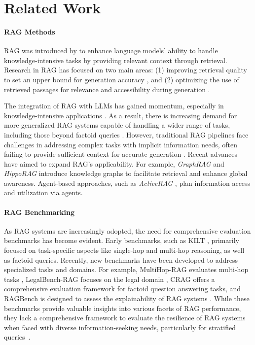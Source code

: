 \section{Related Work}
\paragraph{RAG Methods}  
RAG was introduced by \citet{lewis2020retrieval} to enhance language models' ability to handle knowledge-intensive tasks by providing relevant context through retrieval. Research in RAG has focused on two main areas: (1) improving retrieval quality to set an upper bound for generation accuracy \cite{qian2024grounding, gao2024retrievalaugmented}, and (2) optimizing the use of retrieved passages for relevance and accessibility during generation \cite{jiang2023active, longrag}.  

The integration of RAG with LLMs has gained momentum, especially in knowledge-intensive applications \cite{raghallucination}. As a result, there is increasing demand for more generalized RAG systems capable of handling a wider range of tasks, including those beyond factoid queries \cite{zhao2024retrievalaugmentedgenerationrag}. However, traditional RAG pipelines face challenges in addressing complex tasks with implicit information needs, often failing to provide sufficient context for accurate generation \cite{gao2024retrievalaugmented, zhao2024retrievalaugmentedgenerationrag}.  
Recent advances have aimed to expand RAG’s applicability. For example, \textit{GraphRAG} \cite{edge2024localglobalgraphrag} and \textit{HippoRAG} \cite{gutiérrez2024hipporagneurobiologicallyinspiredlongterm} introduce knowledge graphs to facilitate retrieval and enhance global awareness. Agent-based approaches, such as \textit{ActiveRAG} \cite{activerag, yoon2024compactcompressingretrieveddocuments}, plan information access and utilization via agents. 


\paragraph{RAG Benchmarking}  
As RAG systems are increasingly adopted, the need for comprehensive evaluation benchmarks has become evident. Early benchmarks, such as KILT \cite{kilt}, primarily focused on task-specific aspects like single-hop and multi-hop reasoning, as well as factoid queries. Recently, new benchmarks have been developed to address specialized tasks and domains. For example, MultiHop-RAG evaluates multi-hop tasks \cite{multihopbench}, LegalBench-RAG focuses on the legal domain \cite{LegalBench}, CRAG offers a comprehensive evaluation framework for factoid question answering tasks, and RAGBench is designed to assess the explainability of RAG systems \cite{RAGBench}. While these benchmarks provide valuable insights into various facets of RAG performance, they lack a comprehensive framework to evaluate the resilience of RAG systems when faced with diverse information-seeking needs, particularly for stratified queries~\cite{zhao2024retrievalaugmentedgenerationrag}.